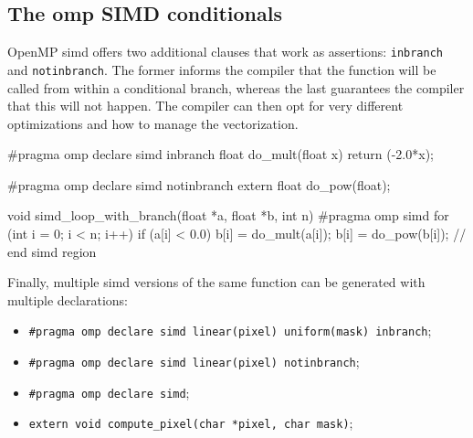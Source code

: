 
\subsection{The omp SIMD conditionals}

OpenMP simd offers two additional clauses that work as assertions: \texttt{inbranch} and \texttt{notinbranch}. The former informs the compiler that the function will be called from within a conditional branch, whereas the last guarantees the compiler that this will not happen. 
The compiler can then opt for very different optimizations and how to manage the vectorization.

\begin{codeblock}[language=C]
#pragma omp declare simd inbranch
float do_mult(float x) {
    return (-2.0*x);
}

#pragma omp declare simd notinbranch 
extern float do_pow(float);

void simd_loop_with_branch(float *a, float *b, int n) {
    #pragma omp simd 
    for (int i = 0; i < n; i++) {
        if (a[i] < 0.0) {
            b[i] = do_mult(a[i]);
        }
        b[i] = do_pow(b[i]);
    } // end simd region 
}
\end{codeblock}

Finally, multiple simd versions of the same function can be generated with multiple declarations:
\begin{itemize}
    \item \texttt{\#pragma omp declare simd linear(pixel) uniform(mask) inbranch};
    \item \texttt{\#pragma omp declare simd linear(pixel) notinbranch};
    \item \texttt{\#pragma omp declare simd};
    \item \texttt{extern void compute\_pixel(char *pixel, char mask)};
\end{itemize}